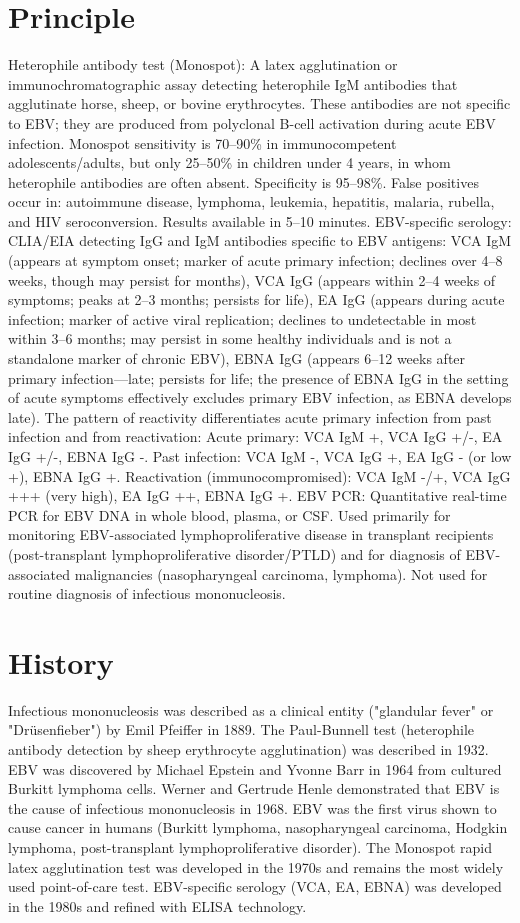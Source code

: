 \section*{Principle}
Heterophile antibody test (Monospot): A latex agglutination or immunochromatographic assay detecting heterophile IgM antibodies that agglutinate horse, sheep, or bovine erythrocytes. These antibodies are not specific to EBV; they are produced from polyclonal B-cell activation during acute EBV infection. Monospot sensitivity is 70--90\% in immunocompetent adolescents/adults, but only 25--50\% in children under 4 years, in whom heterophile antibodies are often absent. Specificity is 95--98\%. False positives occur in: autoimmune disease, lymphoma, leukemia, hepatitis, malaria, rubella, and HIV seroconversion. Results available in 5--10 minutes. EBV-specific serology: CLIA/EIA detecting IgG and IgM antibodies specific to EBV antigens: VCA IgM (appears at symptom onset; marker of acute primary infection; declines over 4--8 weeks, though may persist for months), VCA IgG (appears within 2--4 weeks of symptoms; peaks at 2--3 months; persists for life), EA IgG (appears during acute infection; marker of active viral replication; declines to undetectable in most within 3--6 months; may persist in some healthy individuals and is not a standalone marker of chronic EBV), EBNA IgG (appears 6--12 weeks after primary infection---late; persists for life; the presence of EBNA IgG in the setting of acute symptoms effectively excludes primary EBV infection, as EBNA develops late). The pattern of reactivity differentiates acute primary infection from past infection and from reactivation: Acute primary: VCA IgM +, VCA IgG +/-, EA IgG +/-, EBNA IgG -. Past infection: VCA IgM -, VCA IgG +, EA IgG - (or low +), EBNA IgG +. Reactivation (immunocompromised): VCA IgM -/+, VCA IgG +++ (very high), EA IgG ++, EBNA IgG +. EBV PCR: Quantitative real-time PCR for EBV DNA in whole blood, plasma, or CSF. Used primarily for monitoring EBV-associated lymphoproliferative disease in transplant recipients (post-transplant lymphoproliferative disorder/PTLD) and for diagnosis of EBV-associated malignancies (nasopharyngeal carcinoma, lymphoma). Not used for routine diagnosis of infectious mononucleosis.

\section*{History}
Infectious mononucleosis was described as a clinical entity ("glandular fever" or "Drüsenfieber") by Emil Pfeiffer in 1889. The Paul-Bunnell test (heterophile antibody detection by sheep erythrocyte agglutination) was described in 1932. EBV was discovered by Michael Epstein and Yvonne Barr in 1964 from cultured Burkitt lymphoma cells. Werner and Gertrude Henle demonstrated that EBV is the cause of infectious mononucleosis in 1968. EBV was the first virus shown to cause cancer in humans (Burkitt lymphoma, nasopharyngeal carcinoma, Hodgkin lymphoma, post-transplant lymphoproliferative disorder). The Monospot rapid latex agglutination test was developed in the 1970s and remains the most widely used point-of-care test. EBV-specific serology (VCA, EA, EBNA) was developed in the 1980s and refined with ELISA technology.

